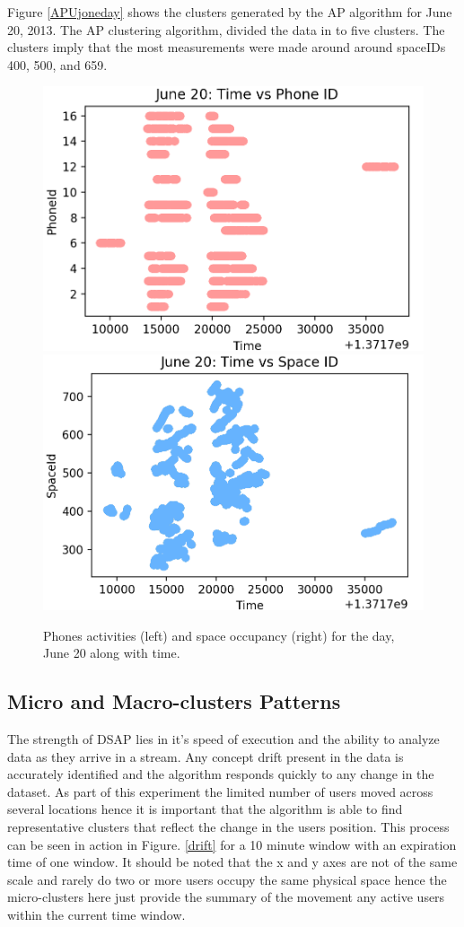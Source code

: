 Figure \ref{APUjoneday} shows the clusters generated by the AP algorithm for June 20, 2013. The AP clustering algorithm, divided the data in to five clusters. %
The clusters imply that the most measurements were made around around spaceIDs 400, 500, and 659. 


\begin{figure}[!h]
    \centering
    \includegraphics[width=.48\textwidth]{image/Chapters/Chapter6/june20timephone.png}
        \includegraphics[width=.48\textwidth]{image/Chapters/Chapter6/june20timespace.png}
    \\[\smallskipamount]    
  
    \caption{Phones activities (left) and space occupancy (right) for the day, June 20 along with time.  }
    \label{jun20dat}
\end{figure}



\subsection{Micro and Macro-clusters Patterns}
 The strength of DSAP lies in it's speed of execution and the ability to analyze data as they arrive in a stream. Any concept drift present in the data is accurately identified and the algorithm responds quickly to any change in the dataset. As part of this experiment the limited number of users moved across several locations hence it is important that the algorithm is able to find representative clusters that reflect the change in the users position. This process can be seen in action in Figure. \ref{drift} for a 10 minute window with an expiration time of one window. It should be noted that the x and y axes are not of the same scale and rarely do two or more users occupy the same physical space hence the micro-clusters here just provide the summary of the movement any active users within the current time window.

